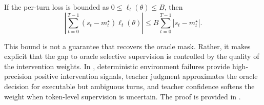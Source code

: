 \begin{proposition}
\label{prop:oracle_approx}
If the per-turn loss is bounded as $0\leq\ell_t(\theta)\leq B$, then
\begin{equation}
\label{eq:oracle_bound}
\left|
\sum_{t=0}^{T-1}
(s_t-m_t^\star)\ell_t(\theta)
\right|
\leq
B\sum_{t=0}^{T-1}
|s_t-m_t^\star| .
\end{equation}
\end{proposition}

This bound is not a guarantee that \ours{} recovers the oracle mask.
%
Rather, it makes explicit that the gap to oracle selective supervision is controlled by the quality of the intervention weights.
%
In \ours{}, deterministic environment failures provide high-precision positive intervention signals, teacher judgment approximates the oracle decision for executable but ambiguous turns, and teacher confidence softens the weight when token-level supervision is uncertain.
%
The proof is provided in .